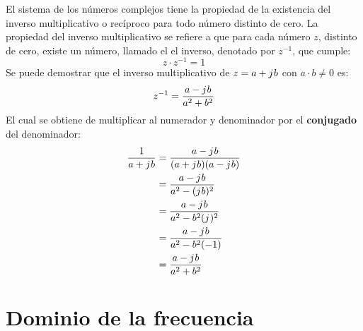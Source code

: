 \documentclass[
	12pt, %
	fleqn, %
	a4paper, %
	oneside, %
]{LegrandOrangeBook}
\begin{document}
\begin{definition}
El sistema de los números complejos tiene la propiedad de la existencia del inverso multiplicativo o recíproco para todo número distinto de cero. La propiedad del inverso multiplicativo se refiere a que para cada número $z$, distinto de cero, existe un número, llamado el el inverso, denotado por $z^{-1}$, que cumple:
\begin{equation}
z\cdot z^{-1}=1
\end{equation}
Se puede demostrar que el inverso multiplicativo de $z=a+{j\mkern1mu} b$ con $a\cdot b\neq 0$ es:
\begin{equation}
z^{-1}=\frac{a-{j\mkern1mu} b}{a^2+b^2}
\end{equation}
El cual se obtiene de multiplicar al numerador y denominador por el \textbf{conjugado} del denominador:
\begin{align*}
\frac{1}{a+{j\mkern1mu} b}&=\frac{a-{j\mkern1mu} b}{(a+{j\mkern1mu} b)(a-{j\mkern1mu} b)}\\
&=\frac{a-{j\mkern1mu} b}{a^2-({j\mkern1mu} b)^2}\\
&=\frac{a-{j\mkern1mu} b}{a^2-b^2({j\mkern1mu})^2}\\
&=\frac{a-{j\mkern1mu} b}{a^2-b^2(-1)}\\
&=\frac{a-{j\mkern1mu} b}{a^2+b^2}
\end{align*}
\end{definition}
\chapter{Dominio de la frecuencia}\label{chap:dom freq}
\end{document}
